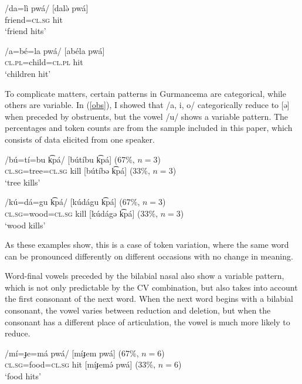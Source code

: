 \documentclass[output=paper,newtxmath,modfonts,nonflat,draftmode]{langsci/langscibook}
\begin{document}
\ea \label{ex:baird:approx}
\ea \label{ex:baird:approx:a}
\gll /da=lì pwá/ \hspace{0.8cm} [dalə̀ pwá]\\
friend=\textsc{cl.sg} hit\\
\glt `friend hits'

\ex \label{ex:baird:approx:b}
\gll /a=bé=la pwá/ \hspace{0.5cm} [abéla pwá]\\
\textsc{cl.pl}=child=\textsc{cl.pl} hit\\
\glt `children hit'
\z
\z

To complicate matters, certain patterns in Gurmancema are categorical, while others are variable. In (\ref{obs}), I showed that /a, i, o/ categorically reduce to [ə] when preceded by obstruents, but the vowel /u/ shows a variable pattern. The percentages and token counts are from the sample included in this paper, which consists of data elicited from one speaker. 

\ea \label{u}
\ea
\gll /bú=tí=bu k͡pá/  \hspace{0.6cm} [bútíbu k͡pá] (67\%, $n=3$) \\
 \textsc{cl.sg}=tree=\textsc{cl.sg} kill \hspace{0.5cm} [bútíbə k͡pá] (33\%, $n=3$)\\ 
\glt `tree kills'

\ex
\gll /kú=dá=gu k͡pá/  \hspace{0.5cm} [kúdágu k͡pá] (67\%, $n=3$) \\
 \textsc{cl.sg}=wood=\textsc{cl.sg} kill \hspace{0.5cm} [kúdágə k͡pá] (33\%, $n=3$)\\ 
\glt `wood kills'
\z
\z

As these examples show, this is a case of token variation, where the same word can be pronounced differently on different occasions with no change in meaning. 

Word-final vowels preceded by the bilabial nasal also show a variable pattern, which is not only predictable by the CV combination, but also takes into account the first consonant of the next word. When the next word begins with a bilabial consonant, the vowel varies between reduction and deletion, but when the consonant has a different place of articulation, the vowel is much more likely to reduce. 

\ea \label{m}
\ea
\gll /mí=ɟe=má pwá/ \hspace{0.5cm} [míɟem pwá] (67\%, $n=6$)\\
 \textsc{cl.sg}=food=\textsc{cl.sg} hit  \hspace{0.5cm} [míɟemə́ pwá] (33\%, $n=6$)\\ 
\glt `food hits'
\end{document}
